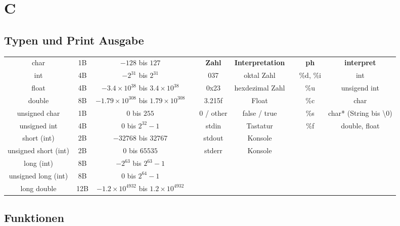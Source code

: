 
\section*{C}


\subsection*{Typen und Print Ausgabe}

\begin{tabular}{|c|c|c|c|c|c|c|c|c|}
\cline{1-3} \cline{5-6} \cline{8-9} 
char & 1B & $-128$ bis $127$ &  & \textbf{Zahl} & \textbf{Interpretation} &  & \textbf{ph} & \textbf{interpret}\tabularnewline
\cline{1-3} \cline{5-6} \cline{8-9} 
int & 4B & $-2^{31}$ bis $2^{31}$ &  & 037 & oktal Zahl &  & \%d, \%i & int\tabularnewline
\cline{1-3} \cline{5-6} \cline{8-9} 
float & 4B & $-3.4\times10^{38}$ bis $3.4\times10^{38}$ &  & 0x23 & hexdezimal Zahl &  & \%u & unsigend int\tabularnewline
\cline{1-3} \cline{5-6} \cline{8-9} 
double & 8B & $-1.79\times10^{308}$ bis $1.79\times10^{308}$ &  & 3.215f & Float &  & \%c & char\tabularnewline
\cline{1-3} \cline{5-6} \cline{8-9} 
unsigned char & 1B & $0$ bis $255$ &  & 0 / other & false / true &  & \%s & char{*} (String bis \textbackslash{}0)\tabularnewline
\cline{1-3} \cline{5-6} \cline{8-9} 
unsigned int & 4B & $0$ bis $2^{32}-1$ &  & stdin & Tastatur &  & \%f & double, float\tabularnewline
\cline{1-3} \cline{5-6} \cline{8-9} 
short (int) & 2B & $-32768$ bis $32767$ &  & stdout & Konsole &  &  & \tabularnewline
\cline{1-3} \cline{5-6} \cline{8-9} 
unsigned short (int) & 2B & $0$ bis $65535$ &  & stderr & Konsole &  &  & \tabularnewline
\cline{1-3} \cline{5-6} \cline{8-9} 
long (int) & 8B & $-2^{63}$ bis $2^{63}-1$ &  &  &  &  &  & \tabularnewline
\cline{1-3} \cline{5-6} \cline{8-9} 
unsigned long (int) & 8B & $0$ bis $2^{64}-1$ &  &  &  &  &  & \tabularnewline
\cline{1-3} \cline{5-6} \cline{8-9} 
long double & 12B & $-1.2\times10^{4932}$ bis $1.2\times10^{4932}$ &  &  &  &  &  & \tabularnewline
\cline{1-3} \cline{5-6} \cline{8-9} 
\end{tabular}


\subsection*{Funktionen}


